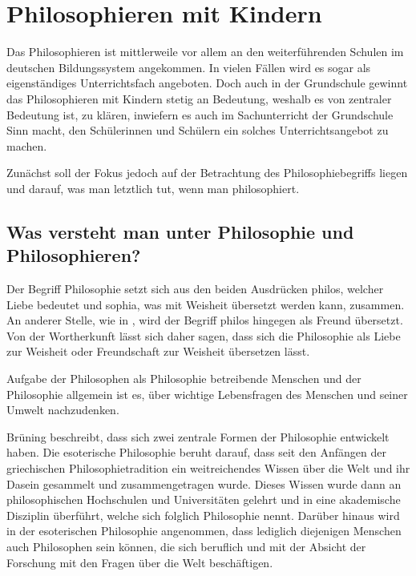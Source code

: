 \section{Philosophieren mit Kindern}

Das Philosophieren ist mittlerweile vor allem an den weiterführenden Schulen im deutschen Bildungssystem angekommen.
 In vielen Fällen wird es sogar als eigenständiges Unterrichtsfach angeboten. 
 Doch auch in der Grundschule gewinnt das Philosophieren mit Kindern stetig an Bedeutung, weshalb es von zentraler Bedeutung ist, zu klären, inwiefern es auch im Sachunterricht der 
 Grundschule Sinn macht, den Schülerinnen und Schülern ein solches Unterrichtsangebot zu machen. 
 
Zunächst soll der Fokus jedoch auf der Betrachtung des Philosophiebegriffs liegen und darauf, was man letztlich tut, wenn man philosophiert.



\subsection{Was versteht man unter Philosophie und Philosophieren?}

Der Begriff \glqq Philosophie\grqq{} setzt sich aus den beiden Ausdrücken \glqq philos\grqq{}, welcher Liebe bedeutet und \glqq sophia\grqq{}, was mit Weisheit übersetzt werden kann, zusammen\cite[S.\,8]{BB10}. 
An anderer Stelle, wie in  \cite{GT16}, wird der Begriff \glqq philos\grqq{} hingegen als \glqq Freund\grqq{} übersetzt. 
Von der Wortherkunft lässt sich daher sagen, dass sich die Philosophie als \glqq Liebe zur Weisheit\grqq{} oder \glqq Freundschaft zur Weisheit\grqq{} übersetzen lässt. 

Aufgabe der Philosophen als Philosophie betreibende Menschen und der Philosophie allgemein ist es, \glqq über wichtige Lebensfragen\grqq{} des Menschen und seiner Umwelt nachzudenken\cite[S.\,8]{BB10}. 

Brüning beschreibt, dass sich zwei zentrale Formen der Philosophie entwickelt haben. 
Die esoterische Philosophie beruht darauf, dass seit den Anfängen der griechischen Philosophietradition ein weitreichendes Wissen über die Welt und ihr Dasein gesammelt und zusammengetragen wurde. 
Dieses Wissen wurde dann an philosophischen Hochschulen und Universitäten gelehrt und in eine akademische Disziplin überführt, welche sich folglich Philosophie nennt. 
Darüber hinaus wird in der esoterischen Philosophie angenommen, dass lediglich diejenigen Menschen auch Philosophen sein können, die sich beruflich und mit der Absicht der Forschung mit den Fragen über die Welt beschäftigen.


